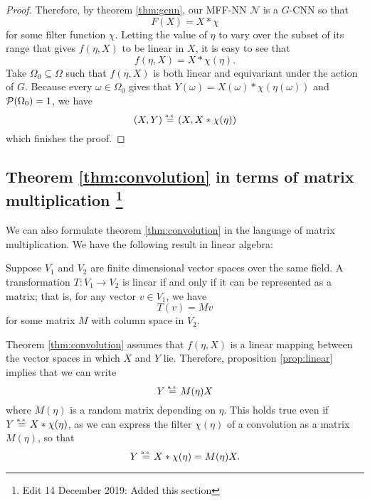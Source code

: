\documentclass[10pt]{article}
\begin{document}
\begin{proof}
Therefore, by theorem \ref{thm:gcnn}, our MFF-NN $\mathcal{N}$ is a $G$-CNN so that
$$
	F(X) = X * \chi
$$
for some filter function $\chi$.
Letting the value of $\eta$ to vary over the subset of its range that gives $f(\eta,X)$ to be linear in $X$, it is easy to see that
$$
	f(\eta,X) = X * \chi(\eta).
$$
Take $\Omega_0 \subseteq \Omega$ such that $f(\eta,X)$ is both linear and equivariant under the action of $G$.
Because every $\omega \in \Omega_0$ gives that $Y(\omega) = X(\omega) * \chi(\eta(\omega))$ and $\P(\Omega_0) = 1$, we have
$$
	(X,Y) \equas (X,X * \chi(\eta))
$$
which finishes the proof.
\end{proof}

\subsection{Theorem \ref{thm:convolution} in terms of matrix multiplication \protect\footnote{Edit 14 December 2019: Added this section}} 
We can also formulate theorem \ref{thm:convolution} in the language of matrix multiplication.
We have the following result in linear algebra:
\begin{proposition} \label{prop:linear}
Suppose $V_1$ and $V_2$ are finite dimensional vector spaces over the same field.
A transformation $T: V_1 \to V_2$ is linear if and only if it can be represented as a matrix; that is, for any vector $v \in V_1$, we have
$$
	T(v) = Mv
$$
for some matrix $M$ with column space in $V_2$.
\end{proposition}
Theorem \ref{thm:convolution} assumes that $f(\eta, X)$ is a linear mapping between the vector spaces in which $X$ and $Y$ lie.
Therefore, proposition \ref{prop:linear} implies that we can write
$$
	Y \equas M(\eta) X
$$
where $M(\eta)$ is a random matrix depending on $\eta$.
This holds true even if $Y \equas X * \chi(\eta)$, as we can express the filter $\chi(\eta)$ of a convolution as a matrix $M(\eta)$, so that
$$
	Y \equas X * \chi(\eta) = M(\eta)X.
$$


\clearpage
\appendix





\printbibliography
\end{document}
